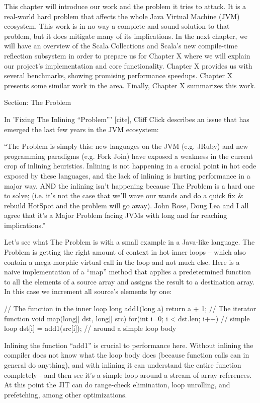 This chapter will introduce our work and the problem it tries to attack. It is a
real-world hard problem that affects the whole Java Virtual Machine (JVM)
ecosystem. This work is in no way a complete and sound solution to that
problem, but it does mitigate many of its implications. In the next chapter, we
will have an overview of the Scala Collections and Scala's new
compile-time reflection subsystem in order to prepare us for Chapter X
where we will explain our project's implementation and core functionality.
Chapter X provides us with several benchmarks, showing promising performance
speedups. Chapter X presents some similar work in the area. Finally, Chapter X
summarizes this work.

Section: The Problem

In 'Fixing The Inlining ``Problem''' [cite], Cliff Click describes an issue
that has emerged the last few years in the JVM ecosystem:

``The Problem is simply this: new languages on the JVM (e.g. JRuby) and new
programming paradigms (e.g. Fork Join) have exposed a weakness in the current
crop of inlining heuristics.  Inlining is not happening in a crucial point in
hot code exposed by these languages, and the lack of inlining is hurting
performance in a major way.  AND the inlining isn’t happening because The
Problem is a hard one to solve; (i.e. it’s not the case that we’ll wave our
wands and do a quick fix & rebuild HotSpot and the problem will go away).   John
Rose, Doug Lea and I all agree that it's a Major Problem facing JVMs with long
and far reaching implications.''

Let's see what The Problem is with a small example in a Java-like language. The
Problem is getting the right amount of context in hot inner loops – which also
contain a mega-morphic virtual call in the loop and not much else.  Here is a
naive implementation of a ``map'' method that applies a predetermined
function to all the elements of a source array and assigns the result to a
destination array. In this case we increment all source's elements by one:

// The function in the inner loop
long add1(long a) {return a + 1;}
// The iterator function
void map(long[] dst, long[] src) {
  for(int i=0; i < dst.len; i++) // simple loop
    dst[i] = add1(src[i]); // around a simple loop body
}

Inlining the function ``add1'' is crucial to performance here.  Without
inlining the compiler does not know what the loop body does (because function
calls can in general do anything), and with inlining it can understand the
entire function completely - and then see it’s a simple loop around a stream of
array references.  At this point the JIT can do range-check elimination, loop
unrolling, and prefetching, among other optimizations.

